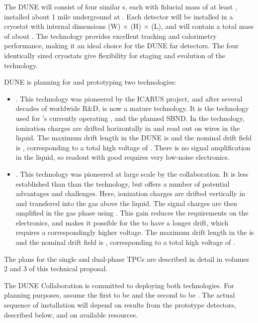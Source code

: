 The DUNE  will consist of four similar \lartpc{}s, each with fiducial mass of at least \nominalmodsize, installed about 1 mile underground at \surf. Each detector will be installed in a cryostat with internal dimensions
\cryostatwdth (W) $\times$ \cryostatht (H) $\times$ \cryostatlen (L), and will contain a total \lar{} mass of about \larmass{}.
The \lartpc technology provides
excellent tracking and calorimetry performance, making it an ideal
choice for the DUNE far detectors. The four identically sized cryostats give flexibility for staging and evolution of the \lartpc technology.

DUNE is planning for and prototyping two \lartpc technologies:
\begin{itemize}
\item \single. This technology was pioneered by the ICARUS project, and after several decades of worldwide R\&D, is now a mature technology. It is the technology used for \fnal{}'s currently operating \microboone, and the planned SBND. In the \single technology, ionization charges are drifted horizontally in \lar and read out on wires in the liquid. The maximum drift length in the DUNE  is \spmaxdrift and the nominal drift field is \spmaxfield, corresponding to a total high voltage of \sptargetdriftvoltpos. There is no signal amplification in the liquid, so readout with good  requires very low-noise electronics.

\item \dual. This technology was pioneered at large scale by the  collaboration. It is less established than than the \single technology, but offers a number of potential advantages and challenges. Here, ionization charges are drifted vertically in \lar and transfered into the gas above the liquid. The signal charges are then amplified in the gas phase using . This gain reduces the requirements on the electronics, and makes it possible for the  to have a longer drift, which requires a correspondingly higher voltage.
The maximum drift length in the  is \dpmaxdrift and the nominal drift field is \dpnominaldriftfield, corresponding to a total high voltage of \dptargetdriftvoltpos. 

\end{itemize}
The plans for the single and dual-phase TPCs are described in detail in volumes 2 and 3 of this technical proposal.

The DUNE Collaboration is committed to deploying both technologies. 
For planning purposes, assume the first  to be
\single and the second to be \dual.
The actual sequence of  installation will depend on results from the prototype detectors, described below, and on available resources.


